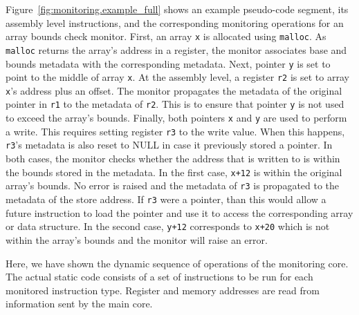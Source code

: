Figure~\ref{fig:monitoring.example_full} shows an example pseudo-code segment,
its assembly level instructions, and the corresponding monitoring operations
for an array bounds check monitor. 
First, an array {\tt x} is allocated using {\tt malloc}. 
As {\tt malloc} returns the array's address in a register, the monitor
associates base and bounds metadata with the corresponding metadata. 
Next, pointer {\tt y} is set to point to the middle of array {\tt x}. 
At the assembly level, a register {\tt r2} is set to array {\tt x}'s address plus an offset.
The monitor propagates the metadata of the original pointer in {\tt r1} to the
metadata of {\tt r2}. This is to ensure that pointer {\tt y} is not used to exceed the array's bounds.
Finally, both pointers {\tt x} and {\tt y} are used to perform a write. 
This requires setting register {\tt r3} to the write value. When this happens,
{\tt r3}'s metadata is also reset to NULL in case it previously stored a
pointer. In both cases, the monitor checks whether the address that is written
to is within the bounds stored in the metadata. In the first case, {\tt x+12}
is within the original array's bounds. No error is raised and the metadata of
{\tt r3} is propagated to the metadata of the store address. If {\tt r3} were a
pointer, than this would allow a future instruction to load the pointer and use
it to access the corresponding array or data structure. In the second case,
{\tt y+12} corresponds to {\tt x+20} which is not within the array's bounds and
the monitor will raise an error. 

Here, we have shown the dynamic sequence of operations of the monitoring core.
The actual static code consists of a set of instructions to be run for each
monitored instruction type. Register and memory addresses are read from
information sent by the main core.

